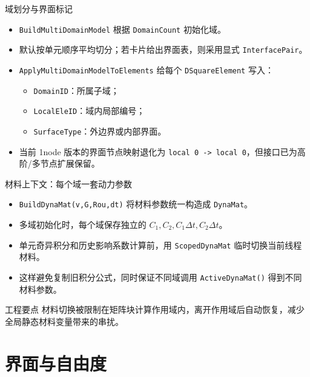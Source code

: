 \documentclass[aspectratio=169,UTF8]{ctexbeamer}
\newcommand{\code}[1]{\texttt{\small #1}}
\begin{document}
\begin{frame}{域划分与界面标记}
  \begin{itemize}
    \item \code{BuildMultiDomainModel} 根据 \code{DomainCount} 初始化域。
    \item 默认按单元顺序平均切分；若卡片给出界面表，则采用显式 \code{InterfacePair}。
    \item \code{ApplyMultiDomainModelToElements} 给每个 \code{DSquareElement} 写入：
      \begin{itemize}
        \item \code{DomainID}：所属子域；
        \item \code{LocalEleID}：域内局部编号；
        \item \code{SurfaceType}：外边界或内部界面。
      \end{itemize}
    \item 当前 1node 版本的界面节点映射退化为 \code{local 0 -> local 0}，但接口已为高阶/多节点扩展保留。
  \end{itemize}
\end{frame}

\begin{frame}{材料上下文：每个域一套动力参数}
  \begin{itemize}
    \item \code{BuildDynaMat(v,G,Rou,dt)} 将材料参数统一构造成 \code{DynaMat}。
    \item 多域初始化时，每个域保存独立的 $C_1,C_2,C_1\Delta t,C_2\Delta t$。
    \item 单元奇异积分和历史影响系数计算前，用 \code{ScopedDynaMat} 临时切换当前线程材料。
    \item 这样避免复制旧积分公式，同时保证不同域调用 \code{ActiveDynaMat()} 得到不同材料参数。
  \end{itemize}

  \begin{block}{工程要点}
    材料切换被限制在矩阵块计算作用域内，离开作用域后自动恢复，减少全局静态材料变量带来的串扰。
  \end{block}
\end{frame}

\section{界面与自由度}
\end{document}
